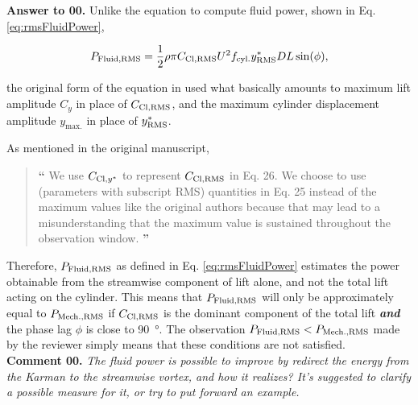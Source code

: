 \documentclass[10pt]{article}
\newcounter{question}
\newcommand{\name}{00}
\newcommand{\question}[1]{\refstepcounter{question} \noindent \textbf{Comment \name.\thequestion}\vskip 0.25cm \noindent \emph{#1}\\}
\newcommand{\answer}[1]{\noindent \textbf{Answer to \name.\thequestion}\vskip 0.25cm \noindent #1 \mbox{}\\}
\begin{document}
\answer{
  Unlike the equation to compute fluid power, shown in Eq. \ref{eq:rmsFluidPower},

  \begin{equation}
    P_{\text{Fluid,RMS}} = \frac{1}{2} \rho \pi C_{\text{Cl},\text{RMS}} U^{2} f_{\text{cyl.}} y^{*}_{\text{RMS}} D L \sin(\phi),
    \label{eq:rmsFluidPower}
  \end{equation}

  \noindent the original form of the equation in \citet{Raghavan2007} used what basically amounts to maximum lift amplitude $C_{y}$ in place of $C_{\text{Cl},\text{RMS}}$, and the maximum cylinder displacement amplitude $y_{\text{max.}}$ in place of $y^{*}_{\text{RMS}}$.

  As mentioned in the original manuscript,

  \begin{quotation}
    {\Large \textbf{``}} We use $C_{\text{Cl},y^{*}}$ to represent $C_{\text{Cl},\text{RMS}}$ in Eq. 26. We choose to use \rms{} (parameters with subscript RMS) quantities in Eq. 25 instead of the maximum values like the original authors because that may lead to a misunderstanding that the maximum value is sustained throughout the observation window. {\Large \textbf{''}}
  \end{quotation}

  \noindent Therefore, $P_{\text{Fluid,RMS}}$ as defined in Eq. \ref{eq:rmsFluidPower} estimates the \rms{} power obtainable from the streamwise component of lift alone, and not the total lift acting on the cylinder. This means that $P_{\text{Fluid,RMS}}$ will only be approximately equal to $P_{\text{Mech.,RMS}}$ if $C_{\text{Cl},\text{RMS}}$ is the dominant component of the total lift \textbf{\textit{and}} the phase lag $\phi$ is close to \SI{90}{\degree}. The observation $P_{\text{Fluid,RMS}} < P_{\text{Mech.,RMS}}$ made by the reviewer simply means that these conditions are not satisfied.
}

\question{The fluid power is possible to improve by redirect the energy from the Karman to the streamwise vortex, and how it realizes? It's suggested to clarify a possible measure for it, or try to put forward an example.}
\end{document}
